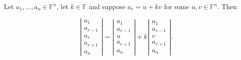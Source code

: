 \documentclass[12pt]{article}
\newenvironment{theorem}[2][Theorem]{\begin{trivlist}
\item[\hskip \labelsep {\bfseries #1}\hskip \labelsep {\bfseries #2.}]}{\end{trivlist}}
\begin{document}
\begin{theorem}{4.3}
Let $a_1, \dots, a_n \in \mathbb{F}^n$, let $k \in \mathbb{F}$ and suppose $a_r = u + kv$ for some $u, v \in \mathbb{F}^n$. Then

$$\left| \begin{array}{c}
     a_1 \\ a_{r-1} \\ a_r \\ a_{r+1} \\ a_n
\end{array} \right| = \left| \begin{array}{c}
     a_1 \\ a_{r-1} \\ u \\ a_{r+1} \\ a_n
\end{array} \right| + k\left| \begin{array}{c}
     a_1 \\ a_{r-1} \\ v \\ a_{r+1} \\ a_n
\end{array} \right|.$$
\end{theorem}
\end{document}
